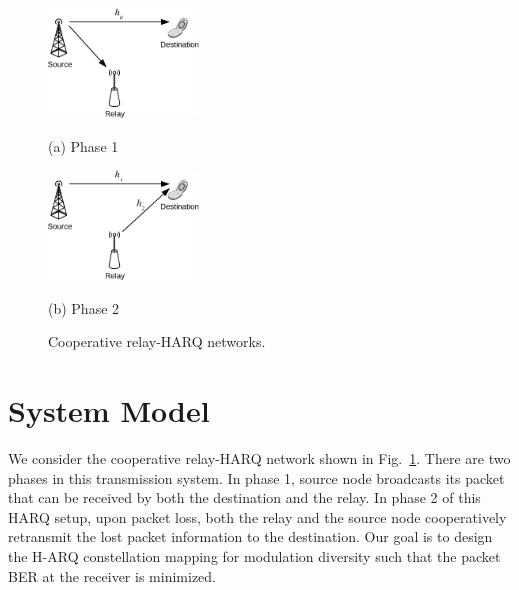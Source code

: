 \documentclass[journal]{IEEEtran}
\begin{document}
\begin{figure}[!t]
    \begin{minipage}[b]{0.48\linewidth}
      \centering
      \centerline{\includegraphics[width=4.0cm]{./figs/relayHARQ1.eps}}
      \centerline{(a) Phase 1}\medskip
    \end{minipage}
    \hfill
    \begin{minipage}[b]{.48\linewidth}
      \centering
      \centerline{\includegraphics[width=4.0cm]{./figs/relayHARQ2.eps}}
      \centerline{(b) Phase 2}\medskip
    \end{minipage}
    \caption{Cooperative relay-HARQ networks.}
    \label{fig:system_model}
\end{figure}



\section{System Model}
\label{sec:model}
We consider the cooperative relay-HARQ network shown in
Fig.~\ref{fig:system_model}. There are two phases in this transmission system.
In phase 1, source node broadcasts its packet that can be received by both the
destination and the relay. In phase 2 of this HARQ setup, upon packet loss,
both the relay and the source node cooperatively retransmit the lost packet
information to the destination. Our goal is to design the H-ARQ constellation
mapping for modulation diversity such that the packet BER at the receiver is
minimized.
\end{document}

